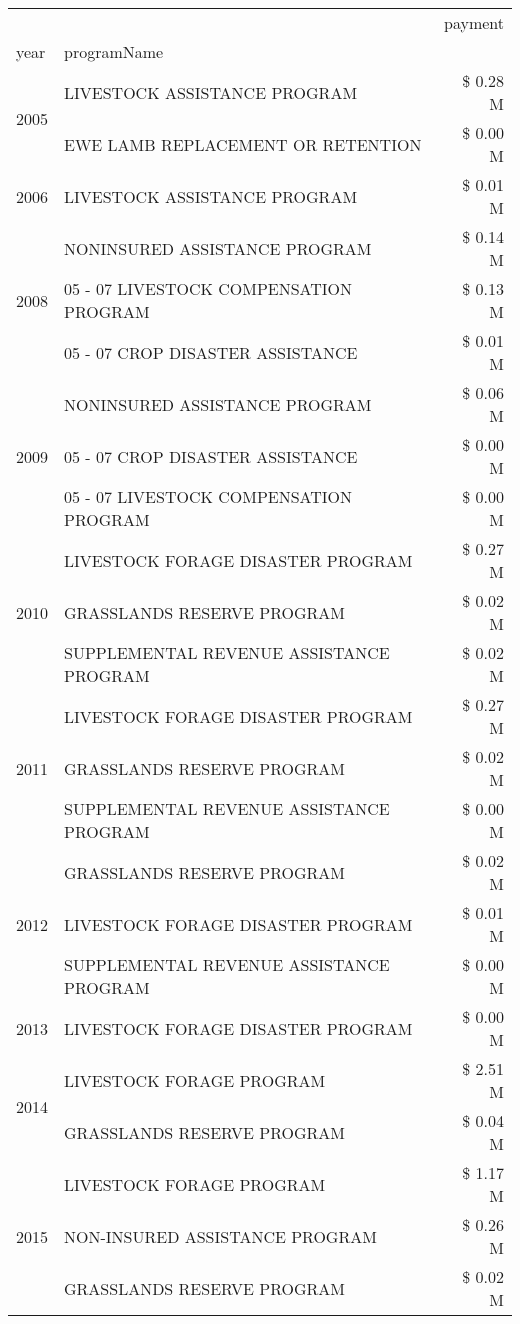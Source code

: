 \begin{tabular}{llr}
\toprule
 &  & payment \\
year & programName &  \\
\midrule
\multirow[t]{2}{*}{2005} & LIVESTOCK ASSISTANCE PROGRAM & \$ 0.28 M \\
 & EWE LAMB REPLACEMENT OR RETENTION & \$ 0.00 M \\
\cline{1-3}
2006 & LIVESTOCK ASSISTANCE PROGRAM & \$ 0.01 M \\
\cline{1-3}
\multirow[t]{3}{*}{2008} & NONINSURED ASSISTANCE PROGRAM & \$ 0.14 M \\
 & 05 - 07 LIVESTOCK COMPENSATION PROGRAM & \$ 0.13 M \\
 & 05 - 07 CROP DISASTER ASSISTANCE & \$ 0.01 M \\
\cline{1-3}
\multirow[t]{3}{*}{2009} & NONINSURED ASSISTANCE PROGRAM & \$ 0.06 M \\
 & 05 - 07 CROP DISASTER ASSISTANCE & \$ 0.00 M \\
 & 05 - 07 LIVESTOCK COMPENSATION PROGRAM & \$ 0.00 M \\
\cline{1-3}
\multirow[t]{3}{*}{2010} & LIVESTOCK FORAGE DISASTER PROGRAM & \$ 0.27 M \\
 & GRASSLANDS RESERVE PROGRAM & \$ 0.02 M \\
 & SUPPLEMENTAL REVENUE ASSISTANCE PROGRAM & \$ 0.02 M \\
\cline{1-3}
\multirow[t]{3}{*}{2011} & LIVESTOCK FORAGE DISASTER PROGRAM & \$ 0.27 M \\
 & GRASSLANDS RESERVE PROGRAM & \$ 0.02 M \\
 & SUPPLEMENTAL REVENUE ASSISTANCE PROGRAM & \$ 0.00 M \\
\cline{1-3}
\multirow[t]{3}{*}{2012} & GRASSLANDS RESERVE PROGRAM & \$ 0.02 M \\
 & LIVESTOCK FORAGE DISASTER PROGRAM & \$ 0.01 M \\
 & SUPPLEMENTAL REVENUE ASSISTANCE PROGRAM & \$ 0.00 M \\
\cline{1-3}
2013 & LIVESTOCK FORAGE DISASTER PROGRAM & \$ 0.00 M \\
\cline{1-3}
\multirow[t]{2}{*}{2014} & LIVESTOCK FORAGE PROGRAM & \$ 2.51 M \\
 & GRASSLANDS RESERVE PROGRAM & \$ 0.04 M \\
\cline{1-3}
\multirow[t]{3}{*}{2015} & LIVESTOCK FORAGE PROGRAM & \$ 1.17 M \\
 & NON-INSURED ASSISTANCE PROGRAM & \$ 0.26 M \\
 & GRASSLANDS RESERVE PROGRAM & \$ 0.02 M \\

\end{tabular}
